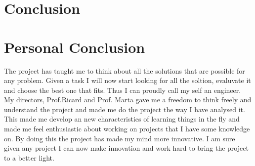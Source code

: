 \section{Conclusion}


\section{Personal Conclusion}
The project has taught me to think about all the solutions that are possible for any problem. Given a task I will now start looking for all the soltion, evaluvate it and choose the best one that fits. Thus I can proudly call my self an engineer. My directors, Prof.Ricard and Prof. Marta gave me a freedom to think freely and understand the project and made me do the project the way I have analysed it.  This made me develop an new characteristics of learning things in the fly and made me feel enthusiastic about working on projects that I have some knowledge on. By doing this the project has made my mind more innovative. I am sure given any project I can now make innovation and work hard to bring the project to a better light.


{}




